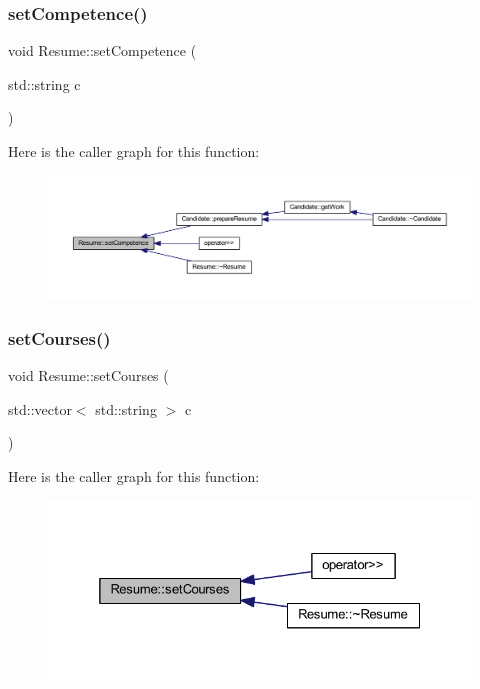 \subsubsection{\texorpdfstring{set\+Competence()}{setCompetence()}}
{\footnotesize\ttfamily void Resume\+::set\+Competence (\begin{DoxyParamCaption}\item[{std\+::string}]{c }\end{DoxyParamCaption})}

Here is the caller graph for this function\+:
\nopagebreak
\begin{figure}[H]
\begin{center}
\leavevmode
\includegraphics[width=350pt]{class_resume_adce5a6624de56751c72f8fe2989da5c9_icgraph}
\end{center}
\end{figure}
\hypertarget{class_resume_a2a80b2496ae5bfbf456f4fe6170b9a21}{}\label{class_resume_a2a80b2496ae5bfbf456f4fe6170b9a21} 
\subsubsection{\texorpdfstring{set\+Courses()}{setCourses()}}
{\footnotesize\ttfamily void Resume\+::set\+Courses (\begin{DoxyParamCaption}\item[{std\+::vector$<$ std\+::string $>$}]{c }\end{DoxyParamCaption})}

Here is the caller graph for this function\+:
\nopagebreak
\begin{figure}[H]
\begin{center}
\leavevmode
\includegraphics[width=325pt]{class_resume_a2a80b2496ae5bfbf456f4fe6170b9a21_icgraph}
\end{center}
\end{figure}
\hypertarget{class_resume_a9a76b4b2d010ce5259b9be3ff9fca2b6}{}\label{class_resume_a9a76b4b2d010ce5259b9be3ff9fca2b6} 
